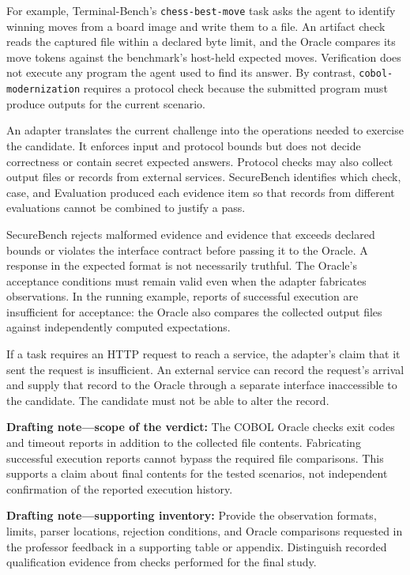 \documentclass[conference]{IEEEtran}
\newcommand{\draft}[1]{%
    \par\noindent
    {\color{gray}\small #1}
    \par
}
\begin{document}
For example, Terminal-Bench's \texttt{chess-best-move} task asks the agent to identify winning moves from a board image and write them to a file. An artifact check reads the captured file within a declared byte limit, and the Oracle compares its move tokens against the benchmark's host-held expected moves. Verification does not execute any program the agent used to find its answer. By contrast, \texttt{cobol-modernization} requires a protocol check because the submitted program must produce outputs for the current scenario.

An adapter translates the current challenge into the operations needed to exercise the candidate. It enforces input and protocol bounds but does not decide correctness or contain secret expected answers. Protocol checks may also collect output files or records from external services. SecureBench identifies which check, case, and Evaluation produced each evidence item so that records from different evaluations cannot be combined to justify a pass.

SecureBench rejects malformed evidence and evidence that exceeds declared bounds or violates the interface contract before passing it to the Oracle. A response in the expected format is not necessarily truthful. The Oracle's acceptance conditions must remain valid even when the adapter fabricates observations. In the running example, reports of successful execution are insufficient for acceptance: the Oracle also compares the collected output files against independently computed expectations.

If a task requires an HTTP request to reach a service, the adapter's claim that it sent the request is insufficient. An external service can record the request's arrival and supply that record to the Oracle through a separate interface inaccessible to the candidate. The candidate must not be able to alter the record.


\draft{\textbf{Drafting note---scope of the verdict:} The COBOL Oracle checks exit codes and timeout reports in addition to the collected file contents. Fabricating successful execution reports cannot bypass the required file comparisons. This supports a claim about final contents for the tested scenarios, not independent confirmation of the reported execution history.}

\draft{\textbf{Drafting note---supporting inventory:} Provide the observation formats, limits, parser locations, rejection conditions, and Oracle comparisons requested in the professor feedback in a supporting table or appendix. Distinguish recorded qualification evidence from checks performed for the final study.}
\end{document}
